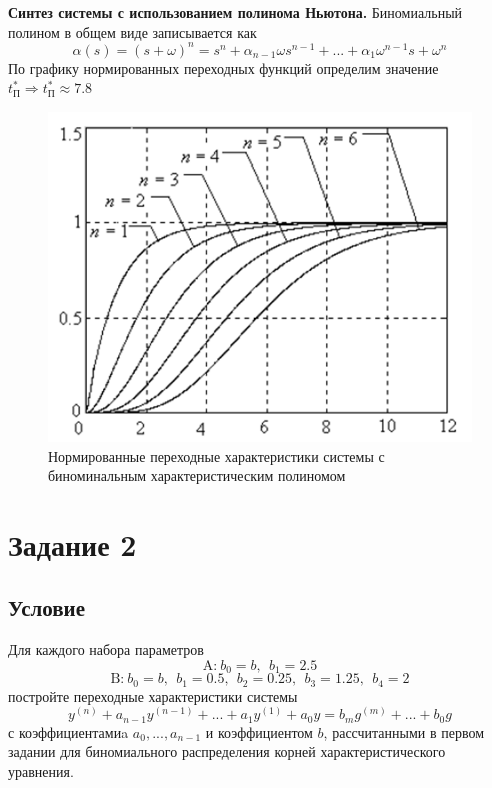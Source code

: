 \documentclass[a4paper, 12pt]{article}
\begin{document}
    \textbf{Синтез системы с использованием полинома Ньютона.}
    Биномиальный полином в общем виде записывается как
    $$\alpha(s)=(s+\omega)^n=s^n+\alpha_{n-1}\omega s^{n-1}+...+\alpha_1\omega^{n-1}s+\omega^n$$
    По графику нормированных переходных функций определим значение $t^*_{\text{П}}\Rightarrow t^*_{\text{П}}\approx7.8$
    \begin{figure}[H]
        \centering
        \includegraphics[scale=0.7]{norm_tf_newton.png}
        \captionsetup{skip=0pt}
        \caption{Нормированные переходные характеристики системы с биноминальным характеристическим полиномом}
        \label{fig:norm_tf_newton}
    \end{figure}


    \section{Задание 2}
    \subsection{Условие}
    Для каждого набора параметров $$\text{A:}\ b_0=b,\ \ b_1=2.5$$
    $$\text{B:}\ b_0=b,\ \ b_1=0.5,\ \ b_2=0.25,\ \ b_3=1.25,\ \ b_4=2$$
    постройте переходные характеристики системы
    $$y^{(n)}+a_{n-1}y^{(n-1)}+...+a_1y^{(1)}+a_0y=b_mg^{(m)}+...+b_0g$$
    с коэффициентамиa $a_0,...,a_{n-1}$ и коэффициентом $b$,
    рассчитанными в первом задании для биномиального распределения
    корней характеристического уравнения.
\end{document}

